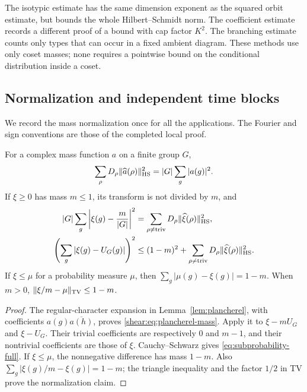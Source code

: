 The isotypic estimate has the same dimension exponent as the squared
orbit estimate, but bounds the whole Hilbert--Schmidt norm. The coefficient
estimate records a different proof of a bound with cap factor \(K^2\).
The branching estimate counts only types that can occur in a fixed
ambient diagram. These methods use only coset masses; none requires a
pointwise bound on the conditional distribution inside a coset.

\subsection{Normalization and independent time blocks}

We record the mass normalization once for all the applications.
The Fourier and sign conventions are those of the completed local proof.

\begin{lemma}
\label{lem:subprobability-fourier}
For a complex mass function \(a\) on a finite group \(G\),
\begin{equation}
 \sum_\rho D_\rho\|\widehat a(\rho)\|_{\mathrm{HS}}^2
 =|G|\sum_g|a(g)|^2.
 \label{shear:eq:plancherel-mass}
\end{equation}
If \(\xi\ge0\) has mass \(m\le1\), its transform is not divided by \(m\),
and
\begin{align}
 |G|\sum_g\left|\xi(g)-\frac{m}{|G|}\right|^2
 &=\sum_{\rho\ne\mathrm{triv}}D_\rho
                   \|\widehat\xi(\rho)\|_{\mathrm{HS}}^2,
 \label{eq:subprobability-centered}\\
 \left(\sum_g|\xi(g)-U_G(g)|\right)^2
 &\le(1-m)^2+\sum_{\rho\ne\mathrm{triv}}D_\rho
                   \|\widehat\xi(\rho)\|_{\mathrm{HS}}^2.
 \label{eq:subprobability-full}
\end{align}
If \(\xi\le\mu\) for a probability measure \(\mu\), then
\(\sum_g|\mu(g)-\xi(g)|=1-m\). When \(m>0\),
\(\|\xi/m-\mu\|_{\mathrm{TV}}\le1-m\).
\end{lemma}
\begin{proof}
The regular-character expansion in Lemma~\ref{lem:plancherel}, with
coefficients \(a(g)\overline{a(h)}\), proves
\eqref{shear:eq:plancherel-mass}. Apply it to \(\xi-mU_G\) and
\(\xi-U_G\). Their trivial coefficients are respectively \(0\) and
\(m-1\), and their nontrivial coefficients are those of \(\xi\).
Cauchy--Schwarz gives \eqref{eq:subprobability-full}.
If \(\xi\le\mu\), the nonnegative difference has mass \(1-m\).
Also \(\sum_g|\xi(g)/m-\xi(g)|=1-m\); the triangle inequality and
the factor \(1/2\) in TV prove the normalization claim.
\end{proof}

